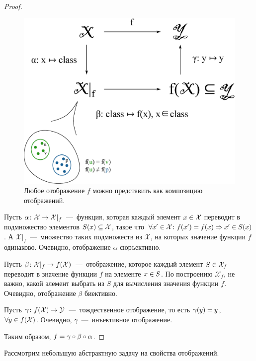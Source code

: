\documentclass[a4paper,12pt]{article}
\begin{document}
  \begin{proof}
    \begin{figure}
      \centering
      
      \includegraphics[width=0.8\columnwidth]{tribute-to-algebraic-approach}
      
      \caption{Любое отображение $f$ можно представить как композицию отображений.}
      \label{fig:tribute-to-algebraic}
    \end{figure}
    
    Пусть $\alpha\colon \mathcal X \hm\to \mathcal X|_f$~---~функция, которая каждый элемент $x \hm\in \mathcal X$ переводит в подмножество элементов $S(x) \hm\subseteq \mathcal X$, такое что $\forall x' \hm\in \mathcal X\colon f(x') \hm= f(x) \hm\Rightarrow x' \hm\in S(x)$.
    А $\mathcal X|_f$~---~множество таких подмножеств из $\mathcal X$, на которых значение функции $f$ одинаково.
    Очевидно, отображение $\alpha$ сюръективно.
    
    Пусть $\beta\colon \mathcal X|_f \hm\to f(\mathcal X)$~---~отображение, которое каждый элемент $S \hm\in \mathcal X_f$ переводит в значение функции $f$ на элементе $x \hm\in S$.
    По построению $\mathcal X_f$, не важно, какой элемент выбрать из $S$ для вычисления значения функции $f$.
    Очевидно, отображение $\beta$ биективно.
    
    Пусть $\gamma\colon f(\mathcal X) \hm\to \mathcal Y$~---~тождественное отображение, то есть $\gamma(y) \hm= y$, $\forall y \hm\in f(\mathcal X)$.
    Очевидно, $\gamma$~---~инъективное отображение.
    
    Таким образом, $f \hm= \gamma \circ \beta \circ \alpha$.
  \end{proof}
  
  Рассмотрим небольшую абстрактную задачу на свойства отображений.
  
\end{document}
